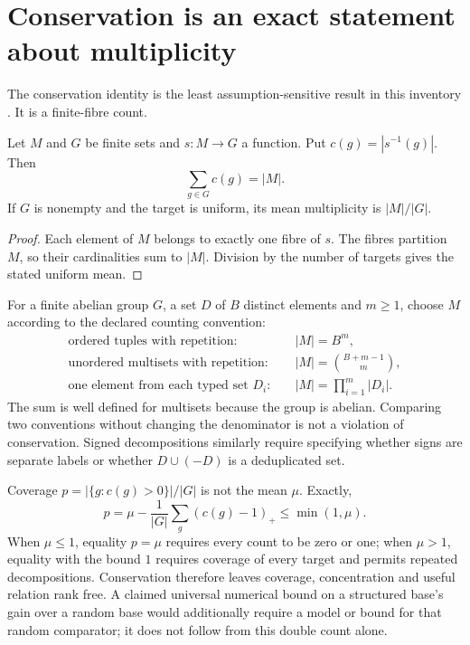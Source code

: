 \section{Conservation is an exact statement about multiplicity}

The conservation identity is the least assumption-sensitive result in
this inventory \cite{yieldSource}. It is a finite-fibre count.

\begin{proposition}
Let $M$ and $G$ be finite sets and $s:M\to G$ a function. Put
$c(g)=|s^{-1}(g)|$. Then
\[
 \sum_{g\in G}c(g)=|M|.
\]
If $G$ is nonempty and the target is uniform, its mean multiplicity is
$|M|/|G|$.
\end{proposition}
\begin{proof}
Each element of $M$ belongs to exactly one fibre of $s$. The fibres
partition $M$, so their cardinalities sum to $|M|$. Division by the
number of targets gives the stated uniform mean.
\end{proof}

For a finite abelian group $G$, a set $D$ of $B$ distinct elements and
$m\geq1$, choose $M$ according to the declared counting convention:
\begin{align*}
 \text{ordered tuples with repetition:}\quad &|M|=B^m,\\
 \text{unordered multisets with repetition:}\quad
 &|M|=\binom{B+m-1}{m},\\
 \text{one element from each typed set }D_i:\quad
 &|M|=\prod_{i=1}^m |D_i|.
\end{align*}
The sum is well defined for multisets because the group is abelian.
Comparing two conventions without changing the denominator is not a
violation of conservation. Signed decompositions similarly require
specifying whether signs are separate labels or whether $D\cup(-D)$ is
a deduplicated set.

Coverage $p=|\{g:c(g)>0\}|/|G|$ is not the mean $\mu$.
Exactly,
\[
 p=\mu-\frac1{|G|}\sum_g(c(g)-1)_+\leq\min(1,\mu).
\]
When $\mu\leq1$, equality $p=\mu$ requires every count to be zero or one;
when $\mu>1$, equality with the bound $1$ requires coverage of every
target and permits repeated decompositions. Conservation therefore
leaves coverage, concentration and useful relation rank free. A claimed
universal numerical bound on a structured base's gain over a random base
would additionally require a model or bound for that random comparator;
it does not follow from this double count alone.

